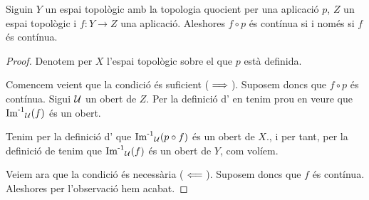 \documentclass[../../Main.tex]{subfiles}
\begin{document}
	\begin{theorem}
		\label{thm:la composició d'una aplicació amb l'aplicació que indueix la topologia en un espai quocient és contínua si i només si aquesta aplicació és contínua}
		Siguin \(Y\) un espai topològic amb la topologia quocient per una aplicació \(p\), \(Z\) un espai topològic i \(f\colon Y\longrightarrow Z\) una aplicació. Aleshores \(f\circ p\) és contínua si i només si \(f\) és contínua.
		\begin{proof}
			Denotem per \(X\) l'espai topològic sobre el que \(p\) està definida.
			
			Comencem veient que la condició és suficient (\(\implies\)). Suposem doncs que \(f\circ p\) és contínua. Sigui \(\mathcal{U}\) un obert de \(Z\). Per la definició d' en tenim prou en veure que \(\operatorname{\operatorname{Im}^{-1}}_{\mathcal{U}}(f)\) és un obert.
			
			Tenim per la definició d' que \(\operatorname{\operatorname{Im}^{-1}}_{\mathcal{U}}(p\circ f)\) és un obert de \(X\)., i per tant, per la definició de  tenim que \(\operatorname{\operatorname{Im}^{-1}}_{\mathcal{U}}(f)\) és un obert de \(Y\), com volíem.
			
			Veiem ara que la condició és necessària (\(\impliedby\)). Suposem doncs que \(f\) és contínua. Aleshores per l'observació  hem acabat.
		\end{proof}
	\end{theorem}
\end{document}
